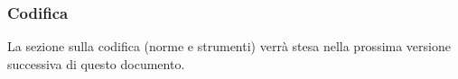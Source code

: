 	\subsubsection{Codifica} \label{sec:cod}
	La sezione sulla codifica (norme e strumenti) verrà stesa nella prossima versione successiva di questo documento.
